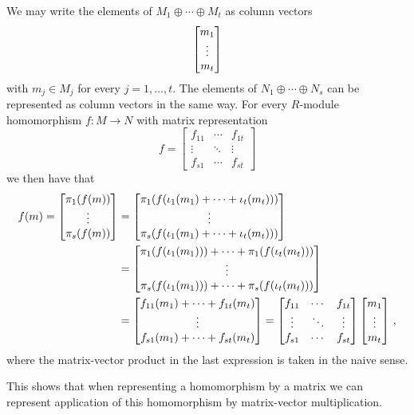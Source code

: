 \begin{fluff}
  We may write the elements of $M_1 \oplus \dotsb \oplus M_t$ as column vectors
  \[
    \begin{bmatrix}m_1 \\ \vdots \\ m_t\end{bmatrix}
  \]
  with $m_j \in M_j$ for every $j = 1, \dotsc, t$.
  The elements of $N_1 \oplus \dotsb \oplus N_s$ can be represented as column vectors in the same way.
  For every $R$-module homomorphism $f \colon M \to N$ with matrix representation
  \[
      f
    = \begin{bmatrix}
        f_{11}  & \cdots  & f_{1t}  \\
        \vdots  & \ddots  & \vdots  \\
        f_{s1}  & \cdots  & f_{st}
      \end{bmatrix}
  \]
  we then have that
  \begin{align*}
        f(m)
     =  \begin{bmatrix} \pi_1(f(m)) \\ \vdots \\ \pi_s(f(m)) \end{bmatrix}
    &=  \begin{bmatrix}
          \pi_1( f( \iota_1(m_1) + \dotsb + \iota_t(m_t) ) )
          \\
          \vdots
          \\
          \pi_s( f( \iota_1(m_1) + \dotsb + \iota_t(m_t) ) )
        \end{bmatrix}
    \\
    &=  \begin{bmatrix}
          \pi_1(f(\iota_1(m_1))) + \dotsb + \pi_1(f(\iota_t(m_t)))
          \\
          \vdots
          \\
          \pi_s(f(\iota_1(m_1))) + \dotsb + \pi_s(f(\iota_t(m_t)))
        \end{bmatrix}
    \\
    &=  \begin{bmatrix}
          f_{11}(m_1) + \dotsb + f_{1t}(m_t)
          \\
          \vdots
          \\
          f_{s1}(m_1) + \dotsb + f_{st}(m_t)
        \end{bmatrix}
    = \begin{bmatrix}
        f_{11}  & \cdots  & f_{1t}  \\
        \vdots  & \ddots  & \vdots  \\
        f_{s1}  & \cdots  & f_{st}
      \end{bmatrix}
      \begin{bmatrix}m_1 \\ \vdots \\ m_t\end{bmatrix} \,,
  \end{align*}
  where the matrix-vector product in the last expression is taken in the naive sense.
  
  This shows that when representing a homomorphism by a matrix we can represent application of this homomorphism by matrix-vector multiplication.
\end{fluff}


